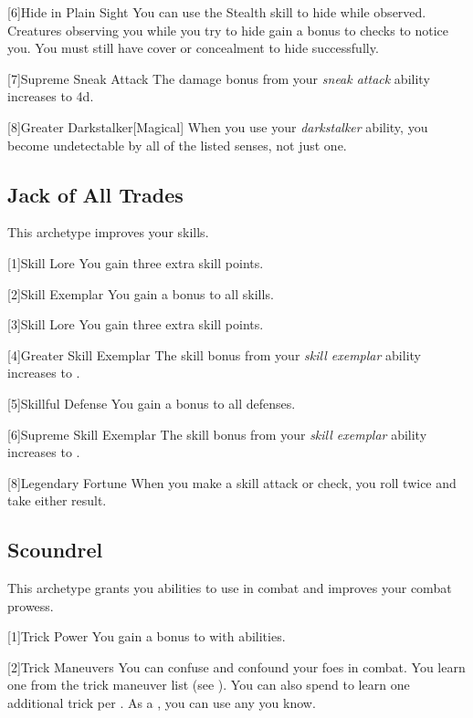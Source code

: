         [6]{Hide in Plain Sight} You can use the Stealth skill to hide while observed.
        Creatures observing you while you try to hide gain a  bonus to checks to notice you.
        You must still have cover or concealment to hide successfully.

        [7]{Supreme Sneak Attack} The damage bonus from your \textit{sneak attack} ability increases to \plus4d.

        [8]{Greater Darkstalker}[Magical] When you use your \textit{darkstalker} ability, you become undetectable by all of the listed senses, not just one.

    \subsection{Jack of All Trades}
        This archetype improves your skills.

        [1]{Skill Lore} You gain three extra skill points.

        [2]{Skill Exemplar} You gain a  bonus to all skills.

        [3]{Skill Lore} You gain three extra skill points.

        [4]{Greater Skill Exemplar} The skill bonus from your \textit{skill exemplar} ability increases to .

        [5]{Skillful Defense} You gain a  bonus to all defenses.

        [6]{Supreme Skill Exemplar} The skill bonus from your \textit{skill exemplar} ability increases to .

        [8]{Legendary Fortune} When you make a skill attack or check, you roll twice and take either result.

    \subsection{Scoundrel}
        This archetype grants you abilities to use in combat and improves your combat prowess.

        [1]{Trick Power} You gain a  bonus to  with  abilities.

        [2]{Trick Maneuvers}
        You can confuse and confound your foes in combat.
        You learn one  from the trick maneuver list (see ).
        You can also spend  to learn one additional trick  per .
        As a , you can use any  you know.

